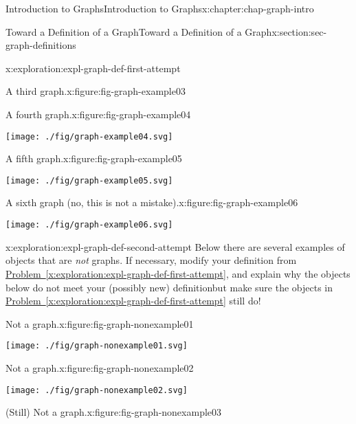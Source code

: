 \documentclass[oneside,10pt,]{book}
\newcommand{\xreffont}{\relax}
\begin{document}
\begin{chapterptx}{Introduction to Graphs}{}{Introduction to Graphs}{}{}{x:chapter:chap-graph-intro}
\begin{sectionptx}{Toward a Definition of a Graph}{}{Toward a Definition of a Graph}{}{}{x:section:sec-graph-definitions}
\begin{exploration}{}{x:exploration:expl-graph-def-first-attempt}
\begin{figureptx}{A third graph.}{x:figure:fig-graph-example03}{}
\tcblower
\end{figureptx}%
\begin{figureptx}{A fourth graph.}{x:figure:fig-graph-example04}{}%
\begin{image}{0.375}{0.25}{0.375}%
\texttt{[image: ./fig/graph-example04.svg]}
\end{image}%
\tcblower
\end{figureptx}%
\begin{figureptx}{A fifth graph.}{x:figure:fig-graph-example05}{}%
\begin{image}{0.375}{0.25}{0.375}%
\texttt{[image: ./fig/graph-example05.svg]}
\end{image}%
\tcblower
\end{figureptx}%
\begin{figureptx}{A sixth graph (no, this is not a mistake).}{x:figure:fig-graph-example06}{}%
\begin{image}{0.375}{0.25}{0.375}%
\texttt{[image: ./fig/graph-example06.svg]}
\end{image}%
\tcblower
\end{figureptx}%
\end{exploration}%
\begin{exploration}{}{x:exploration:expl-graph-def-second-attempt}%
Below there are several examples of objects that are \emph{not} graphs. If necessary, modify your definition from \hyperref[x:exploration:expl-graph-def-first-attempt]{Problem~{\xreffont\ref{x:exploration:expl-graph-def-first-attempt}}}, and explain why the objects below do not meet your (possibly new) definition\textemdash{}but make sure the objects in \hyperref[x:exploration:expl-graph-def-first-attempt]{Problem~{\xreffont\ref{x:exploration:expl-graph-def-first-attempt}}} still do!%
\begin{figureptx}{Not a graph.}{x:figure:fig-graph-nonexample01}{}%
\begin{image}{0.375}{0.25}{0.375}%
\texttt{[image: ./fig/graph-nonexample01.svg]}
\end{image}%
\tcblower
\end{figureptx}%
\begin{figureptx}{Not a graph.}{x:figure:fig-graph-nonexample02}{}%
\begin{image}{0.375}{0.25}{0.375}%
\texttt{[image: ./fig/graph-nonexample02.svg]}
\end{image}%
\tcblower
\end{figureptx}%
\begin{figureptx}{(Still) Not a graph.}{x:figure:fig-graph-nonexample03}{}%

\end{figureptx}
\end{exploration}
\end{sectionptx}
\end{chapterptx}
\end{document}
